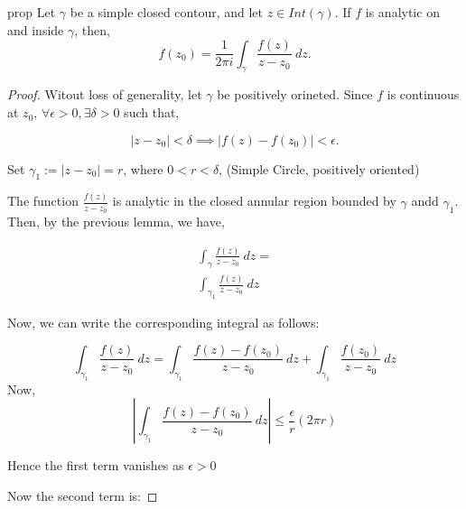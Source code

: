 \begin{restatable}{prop}{}\label{}
	Let $\gamma$ be a simple closed contour, and let $z\in  Int\left( \gamma \right) $. If $f$ is analytic on and inside $\gamma$, then, \\
		\[
		f\left( z_0 \right)  = \frac{1}{2 \pi i} \int_{{\gamma}}^{{}} {\frac{f\left( z \right)}{z-z_0} } \: d{z} {}
		.\] 
\end{restatable}
\begin{proof}
Witout loss of generality, let $\gamma$ be  positively orineted. Since $f$ is continuous at $z_0$, $\forall \epsilon >0, \exists \delta >0$ such that, 

	\[
		|z - z_0| < \delta \implies |f\left( z \right) - f\left( z_0 \right)| < \epsilon 
	.\] 

	Set $\gamma_1:= |z-z_0| = r$, where $0<r<\delta$,    \hspace{5mm}(Simple Circle, positively oriented) 

	The function $\frac{f\left( z \right) }{z-z_0}$ is analytic in the closed annular region bounded by $\gamma$ andd $\gamma_1$. Then, by the previous lemma, we have, 

	\begin{equation*}
        \begin{split}
	\int_{{\gamma}}^{{}} {\frac{f\left( z \right) }{z-z_0}} \: d{z} {} = \\
	\int_{{\gamma_1}}^{{}} {\frac{f\left( z \right) }{z-z_0}} \: d{z} {} 
        \end{split}
    \end{equation*}


	Now, we can write the corresponding integral as follows:

	\begin{equation*}
	\int_{{\gamma_1}}^{{}} {\frac{f\left( z \right) }{z-z_0}} \: d{z} {}  = \int_{{\gamma_1}}^{{}} {\frac{f\left( z \right) - f\left( z_0 \right)  }{z-z_0}} \: d{z} {} + \int_{{\gamma_1}}^{{}} {\frac{f\left( z_0 \right) }{z-z_0}} \: d{z} {} 
    \end{equation*}
	Now, 
	\begin{equation*}
		|\int_{{\gamma_1}}^{{}} {\frac{f\left( z \right) - f\left( z_0 \right)  }{z-z_0}} \: d{z} {}| \le  \frac{\epsilon}{r}  (2 \pi r)  
    \end{equation*}

	Hence the first term vanishes as $\epsilon>0$ 

	Now the second term is:


\end{proof}
